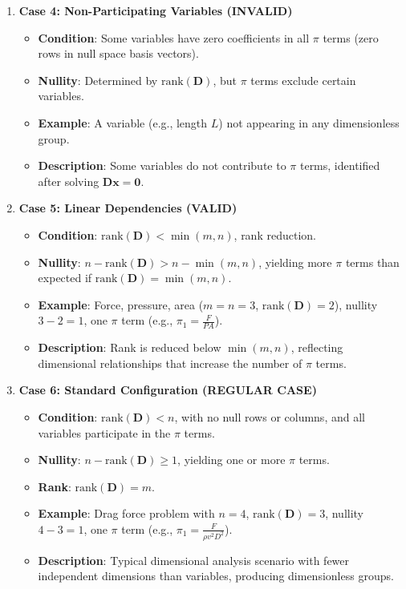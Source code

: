 \begin{enumerate}
  \item \textbf{Case 4: Non-Participating Variables (INVALID)}
    \begin{itemize}
        \item \textbf{Condition}: Some variables have zero coefficients in all $\pi$ terms (zero rows in null space basis vectors).
        \item \textbf{Nullity}: Determined by $\text{rank}(\mathbf{D})$, but $\pi$ terms exclude certain variables.
        \item \textbf{Example}: A variable (e.g., length $L$) not appearing in any dimensionless group.
        \item \textbf{Description}: Some variables do not contribute to $\pi$ terms, identified after solving $\mathbf{D} \mathbf{x} = \mathbf{0}$.
    \end{itemize}

    \item \textbf{Case 5: Linear Dependencies (VALID)}
    \begin{itemize}
        \item \textbf{Condition}: $\text{rank}(\mathbf{D}) < \min(m, n)$, rank reduction.
        \item \textbf{Nullity}: $n - \text{rank}(\mathbf{D}) > n - \min(m, n)$, yielding more $\pi$ terms than expected if $\text{rank}(\mathbf{D}) = \min(m, n)$.
        \item \textbf{Example}: Force, pressure, area ($m=n=3$, $\text{rank}(\mathbf{D})=2$), nullity $3-2=1$, one $\pi$ term (e.g., $\pi_1 = \frac{F}{P A}$).
        \item \textbf{Description}: Rank is reduced below $\min(m, n)$, reflecting dimensional relationships that increase the number of $\pi$ terms.
    \end{itemize}

        \item \textbf{Case 6: Standard Configuration (REGULAR CASE)}
    \begin{itemize}
        \item \textbf{Condition}: $\text{rank}(\mathbf{D}) < n$, with no null rows or columns, and all variables participate in the $\pi$ terms.
        \item \textbf{Nullity}: $n - \text{rank}(\mathbf{D}) \geq 1$, yielding one or more $\pi$ terms.

        \item \textbf{Rank}: $\text{rank}(\mathbf{D}) = m$.

        \item \textbf{Example}: Drag force problem with $n=4$, $\text{rank}(\mathbf{D})=3$, nullity $4-3=1$, one $\pi$ term (e.g., $\pi_1 = \frac{F}{\rho v^2 D^2}$).
        \item \textbf{Description}: Typical dimensional analysis scenario with fewer independent dimensions than variables, producing dimensionless groups.
    \end{itemize}
\end{enumerate}

